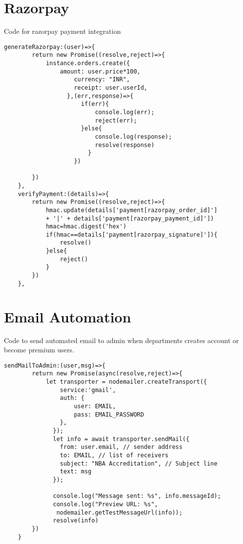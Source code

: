 \documentclass[a4paper,11pt]{report}
\begin{document}
\section{Razorpay}
Code for razorpay payment integration
\begin{verbatim}
generateRazorpay:(user)=>{
        return new Promise((resolve,reject)=>{
            instance.orders.create({
                amount: user.price*100,
                    currency: "INR",
                    receipt: user.userId,
                  },(err,response)=>{
                      if(err){
                          console.log(err);
                          reject(err);
                      }else{
                          console.log(response);
                          resolve(response)
                        }
                    })
            
        })
    },
    verifyPayment:(details)=>{
        return new Promise((resolve,reject)=>{
            hmac.update(details['payment[razorpay_order_id]'] 
            + '|' + details['payment[razorpay_payment_id]'])
            hmac=hmac.digest('hex')
            if(hmac==details['payment[razorpay_signature]']){
                resolve()
            }else{
                reject()
            }
        })
    },
\end{verbatim}

\section{Email Automation}
Code to send automated email to admin when departments creates account or become premium users.
\begin{verbatim}
sendMailToAdmin:(user,msg)=>{
        return new Promise(async(resolve,reject)=>{
            let transporter = nodemailer.createTransport({
                service:'gmail',
                auth: {
                    user: EMAIL,
                    pass: EMAIL_PASSWORD
                },
              });
              let info = await transporter.sendMail({
                from: user.email, // sender address
                to: EMAIL, // list of receivers
                subject: "NBA Accreditation", // Subject line
                text: msg
              });
            
              console.log("Message sent: %s", info.messageId);
              console.log("Preview URL: %s",
               nodemailer.getTestMessageUrl(info));
              resolve(info)
        })
    }
\end{verbatim}
\end{document}
